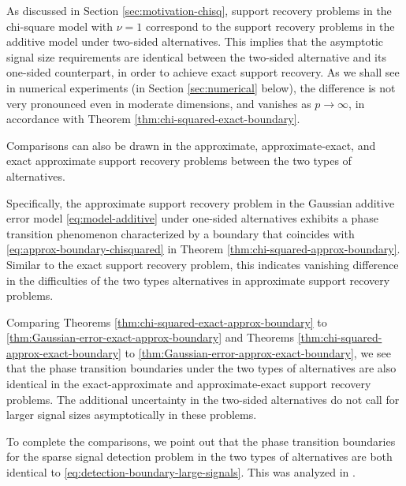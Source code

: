As discussed in Section \ref{sec:motivation-chisq}, support recovery problems in the chi-square model with $\nu=1$ correspond to the support recovery problems in 
the additive model under two-sided alternatives. This implies that the asymptotic signal size requirements are identical between the two-sided alternative and its 
one-sided counterpart, in order to achieve exact support recovery. As we shall see in numerical experiments (in Section \ref{sec:numerical} below), the difference 
is not very pronounced even in moderate dimensions, and vanishes as $p\to\infty$, in accordance with Theorem \ref{thm:chi-squared-exact-boundary}.

\medskip

Comparisons can also be drawn in the approximate, approximate-exact, and exact approximate support recovery problems between the two types of alternatives.

Specifically, the approximate support recovery problem in the Gaussian additive error model \eqref{eq:model-additive} under one-sided alternatives exhibits a phase transition phenomenon characterized by a boundary that coincides with \eqref{eq:approx-boundary-chisquared} in Theorem \ref{thm:chi-squared-approx-boundary}.
Similar to the exact support recovery problem, this indicates vanishing difference in the difficulties of the two types alternatives in approximate support recovery problems.

Comparing Theorems \ref{thm:chi-squared-exact-approx-boundary} to \ref{thm:Gaussian-error-exact-approx-boundary} and Theorems \ref{thm:chi-squared-approx-exact-boundary} to \ref{thm:Gaussian-error-approx-exact-boundary}, we see that the phase transition boundaries under the two types of alternatives are also identical in the exact-approximate and approximate-exact support recovery problems.
The additional uncertainty in the two-sided alternatives do not call for larger signal sizes asymptotically in these problems.

\medskip

To complete the comparisons, we point out that the phase transition boundaries for the sparse signal {detection} problem in the two types of alternatives are both identical to \eqref{eq:detection-boundary-large-signals}. This was analyzed in \cite{donoho2004higher}.




